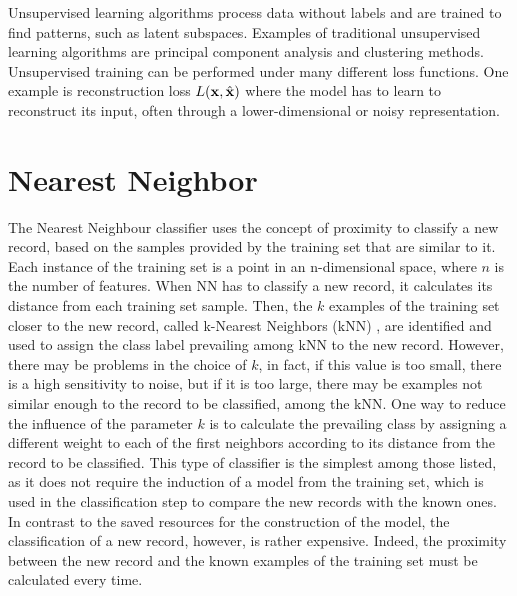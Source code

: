Unsupervised learning algorithms process data without labels and are trained to find patterns, such as latent subspaces. Examples of traditional unsupervised learning algorithms are principal component analysis and clustering methods. Unsupervised training can be performed under many different loss functions. One example is reconstruction loss $L({\bf x}, \hat{{\bf x}})$ where the model has to learn to reconstruct its input, often through a lower-dimensional or noisy representation.

\section{Nearest Neighbor} \label{kNN}
The Nearest Neighbour classifier uses the concept of proximity to classify a new record, based on the samples provided by the training set that are similar to it. Each instance of the training set is a point in an n-dimensional space, where $n$ is the number of features. When NN has to classify a new record, it calculates its distance from each training set sample. Then, the $k$ examples of the training set closer to the new record, called k-Nearest Neighbors (k\acs{NN})  \cite{Cover}, are identified and used to assign the class label prevailing among kNN to the new record. However, there may be problems in the choice of $k$, in fact, if this value is too small, there is a high sensitivity to noise, but if it is too large, there may be examples not similar enough to the record to be classified, among the kNN. One way to reduce the influence of the parameter $k$ is to calculate the prevailing class by assigning a different weight to each of the first neighbors according to its distance from the record to be classified. This type of classifier is the simplest among those listed, as it does not require the induction of a model from the training set, which is used in the classification step to compare the new records with the known ones. In contrast to the saved resources for the construction of the model, the classification of a new record, however, is rather expensive. Indeed, the proximity between the new record and the known examples of the training set must be calculated every time.

